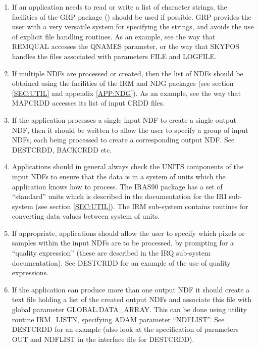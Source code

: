 \documentclass[twoside,11pt,nolof]{starlink}
\begin{document}
\begin{enumerate}

\item If an application needs to read or write a list of character
strings, the facilities of the {\small GRP} package
() should be
used if possible.  {\small GRP} provides the user with a very versatile
system for specifying the strings, and avoids the use of explicit file
handling routines. As an example, see the way that {\small REMQUAL}
accesses the {\small QNAMES} parameter, or the way that {\small SKYPOS}
handles the files associated with parameters {\small FILE} and {\small
LOGFILE}.

\item If multiple {\small NDF}s are processed or created, then the list
of {\small NDF}s should be obtained using the facilities of the {\small
IRM} and {\small NDG} packages (see section \ref{SEC:UTIL} and appendix
\ref{APP:NDG}). As an example, see the way that {\small MAPCRDD} accesses
its list of input {\small CRDD} files.

\item If the application processes a single input {\small NDF} to
create a single output {\small NDF}, then it should be written to allow
the user to specify a group of input {\small NDF}s, each being
processed to create a corresponding output {\small NDF}. See {\small
DESTCRDD, BACKCRDD} etc.

\item Applications should in general always check the {\small UNITS}
components of the input {\small NDF}s to ensure that the data is in a
system of units which the application knows how to process. The {\small
IRAS90} package has a set of ``standard'' units which is described in
the documentation for the {\small IRI} sub-system (see section
\ref{SEC:UTIL}). The {\small IRM} sub-system contains routines for
converting data values between system of units.

\item If appropriate, applications should allow the user to specify
which pixels or samples within the input {\small NDF}s are to be
processed, by prompting for a ``quality expression'' (these are
described in the {\small IRQ} sub-system documentation). See {\small
DESTCRDD} for an example of the use of quality expressions.

\item \label{IT:NDFLIST} If the application can produce more than one
output {\small NDF} it should create a text file holding a list of the
created output {\small NDF}s and associate this file with global
parameter {\small GLOBAL.DATA\_ARRAY}. This can be done using utility
routine {\small IRM\_LISTN}, specifying {\small ADAM} parameter
``{\small NDFLIST}''. See {\small DESTCRDD} for an example (also look
at the specification of parameters {\small OUT} and {\small NDFLIST} in
the interface file for {\small DESTCRDD}).


\end{enumerate}
\end{document}
